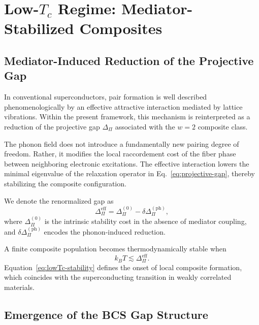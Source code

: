 \section{Low-\texorpdfstring{$T_c$}{Tc} Regime: Mediator-Stabilized Composites}
  \label{sec:low-tc-regime}

  \subsection{Mediator-Induced Reduction of the Projective Gap}
    \label{subsec:mediator-gap}

    In conventional superconductors,
    pair formation is well described phenomenologically
    by an effective attractive interaction
    mediated by lattice vibrations.
    Within the present framework,
    this mechanism is reinterpreted
    as a reduction of the projective gap $\Delta_\Pi$
    associated with the $w=2$ composite class.

    The phonon field does not introduce
    a fundamentally new pairing degree of freedom.
    Rather, it modifies the local raccordement cost
    of the fiber phase between neighboring electronic excitations.
    The effective interaction lowers the minimal eigenvalue
    of the relaxation operator in Eq.~\ref{eq:projective-gap},
    thereby stabilizing the composite configuration.

    We denote the renormalized gap as
    \begin{equation}
      \Delta_\Pi^{\mathrm{eff}}
      =
      \Delta_\Pi^{(0)}
      -
      \delta \Delta_\Pi^{(\mathrm{ph})} ,
    \end{equation}
    where $\Delta_\Pi^{(0)}$ is the intrinsic stability cost
    in the absence of mediator coupling,
    and $\delta \Delta_\Pi^{(\mathrm{ph})}$
    encodes the phonon-induced reduction.

    A finite composite population becomes thermodynamically stable
    when
    \begin{equation}
      k_B T \lesssim \Delta_\Pi^{\mathrm{eff}} .
      \label{eq:lowTc-stability}
    \end{equation}
    Equation~\ref{eq:lowTc-stability}
    defines the onset of local composite formation,
    which coincides with the superconducting transition
    in weakly correlated materials.

  \subsection{Emergence of the BCS Gap Structure}
    \label{subsec:bcs-gap}

